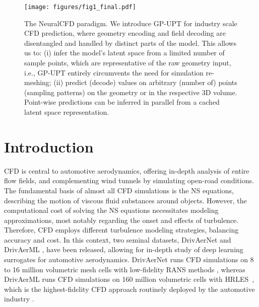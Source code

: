 \begin{figure}[ht!]
    \centering
    \texttt{[image: figures/fig1\_final.pdf]}
    \caption{The NeuralCFD paradigm. We introduce \acf{GP-UPT} for industry scale \ac{CFD} prediction, where geometry encoding and field decoding are disentangled and handled by distinct parts of the model. This allows us to: (i) infer the model’s latent space from a limited number of sample points, which are representative of the raw geometry input, i.e., \ac{GP-UPT} entirely circumvents the need for simulation re-meshing; (ii) predict (decode) values on arbitrary (number of) points (sampling patterns) on the geometry or in the respective 3D volume. Point-wise predictions can be inferred in parallel from a cached latent space representation.}
    \label{fig:fig1}
\end{figure}
\section{Introduction}
\label{sec:introduction}

\Acf{CFD} is central to automotive aerodynamics, offering in-depth analysis of entire flow fields, and complementing wind tunnels by simulating open-road conditions. 
The fundamental basis of almost all \ac{CFD} simulations is the \ac{NS} equations, describing the motion of viscous fluid substances around objects.
However, the computational cost of solving the \ac{NS} equations necessitates modeling approximations, most notably regarding the onset and effects of turbulence. 
Therefore, \ac{CFD} employs different turbulence modeling strategies, balancing accuracy and cost. 
In this context, two seminal datasets, DrivAerNet \cite{elrefaie2024drivaernet, elrefaie2024drivaernet++} and DrivAerML \cite{ashton2024drivaerml}, have been released, allowing for in-depth study of deep learning surrogates for automotive aerodynamics. 
DrivAerNet runs \ac{CFD} simulations on 8 to 16 million volumetric mesh cells with low-fidelity \ac{RANS} methods \cite{reynolds1895iv, alfonsi2009reynolds, ashton2015comparison}, whereas DrivAerML runs \ac{CFD} simulations on 160 million volumetric cells with \ac{HRLES}~\cite{spalart2006new, chaouat2017state, heinz2020review, ashton2022hlpw}, which is the highest-fidelity \ac{CFD} approach routinely deployed by the automotive industry \cite{hupertz2022towards,ashton2024drivaerml}.

